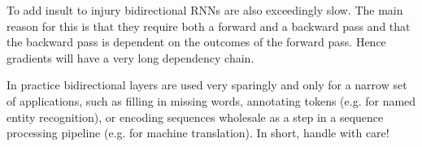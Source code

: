 To add insult to injury bidirectional RNNs are also exceedingly slow. The main reason for this is that they require both a forward and a backward pass and that the backward pass is dependent on the outcomes of the forward pass. Hence gradients will have a very long dependency chain.

In practice bidirectional layers are used very sparingly and only for a narrow set of applications, such as filling in missing words, annotating tokens (e.g. for named entity recognition), or encoding sequences wholesale as a step in a sequence processing pipeline (e.g. for machine translation). In short, handle with care!

